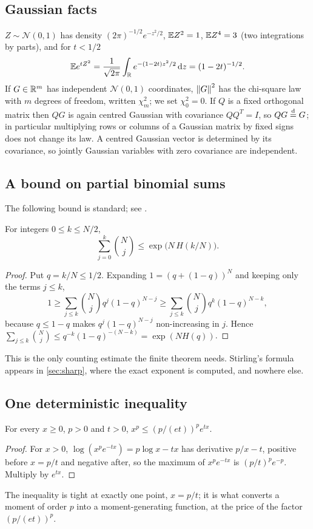 \subsection{Gaussian facts}

$Z\sim\mathcal N(0,1)$ has density $(2\pi)^{-1/2}e^{-z^2/2}$, $\mathbb{E} Z^2=1$, $\mathbb{E} Z^4=3$ (two integrations by parts), and for $t<1/2$
\begin{equation}\label{eq:mgf}
\mathbb{E} e^{tZ^2}=\frac{1}{\sqrt{2\pi}}\int_{\mathbb{R}} e^{-(1-2t)z^2/2}\,\mathrm{d} z=(1-2t)^{-1/2}.
\end{equation}
If $G\in\mathbb{R}^m$ has independent $\mathcal N(0,1)$ coordinates, $\left\lVert G\right\rVert^2$ has the chi-square law with $m$ degrees of freedom, written $\chi^2_m$; we set $\chi^2_0=0$. If $Q$ is a fixed orthogonal matrix then $QG$ is again centred Gaussian with covariance $QQ^T=I$, so $QG\overset{\mathrm{d}}{=} G$; in particular multiplying rows or columns of a Gaussian matrix by fixed signs does not change its law. A centred Gaussian vector is determined by its covariance, so jointly Gaussian variables with zero covariance are independent.

\subsection{A bound on partial binomial sums}
The following bound is standard; see \cite{cover-thomas}.

\begin{lemma}\label{lem:entropy}
For integers $0\le k\le N/2$,
\[
\sum_{j=0}^{k}\binom Nj\le\exp\bigl(N\,H(k/N)\bigr).
\]
\end{lemma}

\begin{proof}
Put $q=k/N\le 1/2$. Expanding $1=(q+(1-q))^N$ and keeping only the terms $j\le k$,
\[
1\ge\sum_{j\le k}\binom Nj q^j(1-q)^{N-j}\ge\sum_{j\le k}\binom Nj q^k(1-q)^{N-k},
\]
because $q\le 1-q$ makes $q^j(1-q)^{N-j}$ non-increasing in $j$. Hence $\sum_{j\le k}\binom Nj\le q^{-k}(1-q)^{-(N-k)}=\exp(NH(q))$.
\end{proof}

This is the only counting estimate the finite theorem needs. Stirling's formula appears in \cref{sec:sharp}, where the exact exponent is computed, and nowhere else.

\subsection{One deterministic inequality}

\begin{lemma}\label{lem:xp}
For every $x\ge 0$, $p>0$ and $t>0$, $x^p\le(p/(et))^pe^{tx}$.
\end{lemma}

\begin{proof}
For $x>0$, $\log(x^pe^{-tx})=p\log x-tx$ has derivative $p/x-t$, positive before $x=p/t$ and negative after, so the maximum of $x^pe^{-tx}$ is $(p/t)^pe^{-p}$. Multiply by $e^{tx}$.
\end{proof}

The inequality is tight at exactly one point, $x=p/t$; it is what converts a moment of order $p$ into a moment-generating function, at the price of the factor $(p/(et))^p$.
